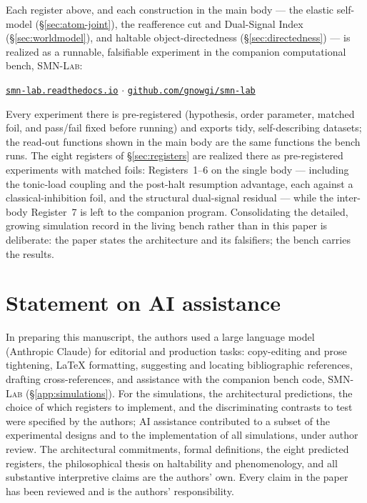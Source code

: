 \documentclass{article}
\begin{document}
Each register above, and each construction in the main body --- the
elastic self-model (\S\ref{sec:atom-joint}), the reafference cut and
Dual-Signal Index (\S\ref{sec:worldmodel}), and haltable
object-directedness (\S\ref{sec:directedness}) --- is realized as a
runnable, falsifiable experiment in the companion computational bench,
\textsc{SMN-Lab}:
\begin{center}
\href{https://smn-lab.readthedocs.io}{\texttt{smn-lab.readthedocs.io}}
\quad$\cdot$\quad
\href{https://github.com/gnowgi/smn-lab}{\texttt{github.com/gnowgi/smn-lab}}
\end{center}
\noindent
Every experiment there is pre-registered (hypothesis, order parameter,
matched foil, and pass/fail fixed before running) and exports tidy,
self-describing datasets; the read-out functions shown in the main body
are the same functions the bench runs.  The eight registers of
\S\ref{sec:registers} are realized there as pre-registered experiments
with matched foils: Registers~1--6 on the single body --- including the
tonic-load coupling and the post-halt resumption advantage, each against a
classical-inhibition foil, and the structural dual-signal residual --- while
the inter-body Register~7 is left to the companion program.  Consolidating
the detailed, growing simulation record in the living bench rather than in
this paper is deliberate: the paper states the architecture and its
falsifiers; the bench carries the results.

\section*{Statement on AI assistance}

In preparing this manuscript, the authors used a large language model
(Anthropic Claude) for editorial and production tasks: copy-editing and
prose tightening, \LaTeX{} formatting, suggesting and locating
bibliographic references, drafting cross-references, and assistance with
the companion bench code, \textsc{SMN-Lab} (\S\ref{app:simulations}).  For
the simulations,
the architectural predictions, the choice of which registers to implement,
and the discriminating contrasts to test were specified by the authors; AI
assistance contributed to a subset of the experimental designs and to the
implementation of all simulations, under author review.  The architectural
commitments, formal definitions, the eight predicted registers, the
philosophical thesis on haltability and phenomenology, and all substantive
interpretive claims are the authors' own.  Every claim in the paper has
been reviewed and is the authors' responsibility.



\end{document}
